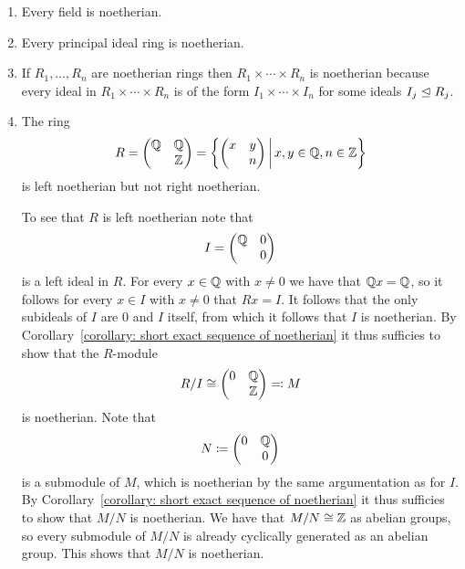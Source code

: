 \begin{example}
  \leavevmode
  \begin{enumerate}
    \item
      Every field is noetherian.
    \item
      Every principal ideal ring is noetherian.
    \item
      If $R_1, \dotsc, R_n$ are noetherian rings then $R_1 \times \dotsb \times R_n$ is noetherian because every ideal in $R_1 \times \dotsb \times R_n$ is of the form $I_1 \times \dotsb \times I_n$ for some ideals $I_j \trianglelefteq R_j$.
    \item
      The ring
      \[
          R
        = \begin{pmatrix}
            \Rational & \Rational \\
                      & \Integer
          \end{pmatrix}
        = \left\{
            \begin{pmatrix}
              x & y \\
                & n 
            \end{pmatrix}
          \suchthat*
            x, y \in \Rational,
            n \in \Integer
          \right\}
      \]
      is left noetherian but not right noetherian.
      
      To see that $R$ is left noetherian note that
      \[
          I
        = \begin{pmatrix}
            \mathbb{Q} & 0 \\
                      & 0
          \end{pmatrix}
      \]
      is a left ideal in $R$.
      For every $x \in \mathbb{Q}$ with $x \neq 0$ we have that $\mathbb{Q} x = \mathbb{Q}$, so it follows for every $x \in I$ with $x \neq 0$ that $Rx = I$.
      It follows that the only subideals of $I$ are $0$ and $I$ itself, from which it follows that $I$ is noetherian.
      By Corollary~\ref{corollary: short exact sequence of noetherian} it thus sufficies to show that the $R$-module
      \[
                R/I
        \cong   \begin{pmatrix}
                  0 & \mathbb{Q} \\
                    & \mathbb{Z}
                \end{pmatrix}
        \eqqcolon M
      \]
      is noetherian.
      Note that
      \[
                  N
        \coloneqq  \begin{pmatrix}
                    0 & \mathbb{Q} \\
                      & 0
                  \end{pmatrix}
      \]
      is a submodule of $M$, which is noetherian by the same argumentation as for $I$.
      By Corollary~\ref{corollary: short exact sequence of noetherian} it thus sufficies to show that $M/N$ is noetherian.
      We have that $M/N \cong \mathbb{Z}$ as abelian groups, so every submodule of $M/N$ is already cyclically generated as an abelian group.
      This shows that $M/N$ is noetherian.
      

\end{enumerate}
\end{example}
